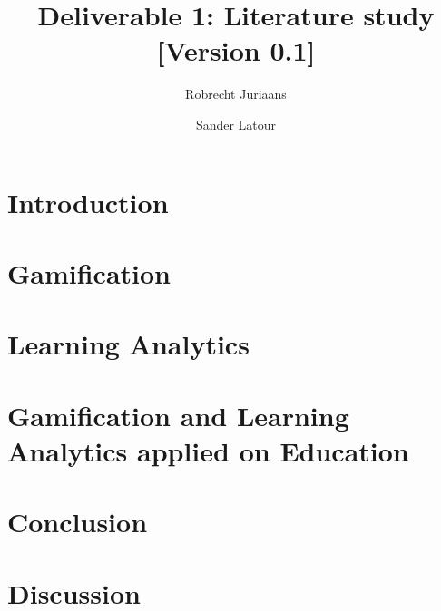 \documentclass{article}
\title{Deliverable 1: Literature study \small{[Version 0.1]}}
\author{Robrecht Juriaans \and Sander Latour}
\begin{document}
\maketitle

\section{Introduction}

\section{Gamification}

\section{Learning Analytics}

\section{Gamification and Learning Analytics applied on Education}

\section{Conclusion}

\section{Discussion}
\end{document}
